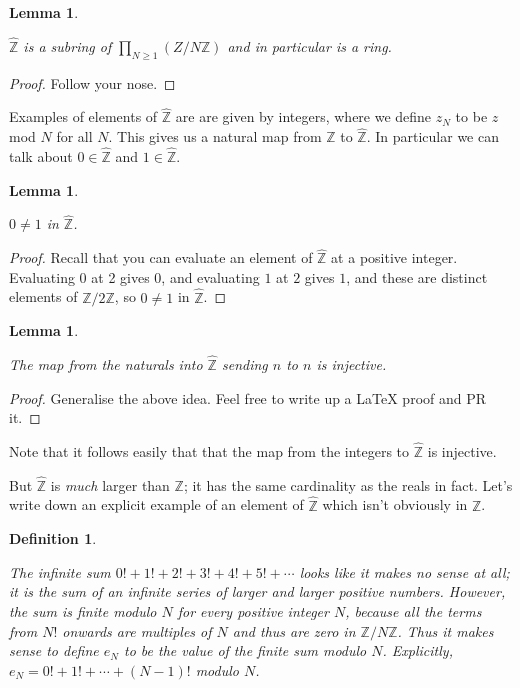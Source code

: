 \documentclass[10pt,a4paper]{article}
\newcommand{\Z}{\mathbb{Z}}
\newcommand{\Zhat}{\widehat{\Z}}
\newtheorem{lemma}[theorem]{Lemma}
\newtheorem{definition}[theorem]{Definition}
\newcommand{\uses}[1]{}
\newcommand{\lean}[1]{}
\newcommand{\leanok}{}
\begin{document}
\begin{lemma}
    \label{ZHat.commRing}
    \lean{ZHat.commRing}
    \uses{ZHat}
    \leanok
    $\Zhat$ is a subring of $\prod_{N\geq1}(Z/N\Z)$ and in particular is a ring.
\end{lemma}
\begin{proof} \leanok Follow your nose.
\end{proof}

Examples of elements of $\Zhat$ are are given by integers, where we define $z_N$ to be $z$
mod $N$ for all $N$. This gives us a natural map from $\Z$ to $\Zhat$. In particular we
can talk about $0\in\Zhat$ and $1\in\Zhat$.

\begin{lemma}
    \label{ZHat.nontrivial}
    \lean{ZHat.nontrivial}
    \uses{ZHat.commRing}
    \leanok
    $0\not=1$ in $\Zhat$.
\end{lemma}
\begin{proof}
    \leanok
    Recall that you can evaluate an element of $\Zhat$ at a positive integer.
    Evaluating $0$ at 2 gives $0$, and evaluating $1$ at $2$ gives $1$, and these
    are distinct elements of $\Z/2\Z$, so $0\not=1$ in $\Zhat$.
\end{proof}

\begin{lemma}
    \label{ZHat.charZero}
    \lean{ZHat.charZero}
    \leanok
    The map from the naturals into $\Zhat$ sending $n$ to $n$ is injective.
\end{lemma}
\begin{proof}
    \leanok
    Generalise the above idea. Feel free to write up a LaTeX proof and PR it.
\end{proof}

Note that it follows easily that that the map from the integers to $\Zhat$ is injective.

But $\Zhat$
is \emph{much} larger than $\Z$; it has the same cardinality as the reals in fact.
Let's write down an explicit example of an element of $\Zhat$ which isn't obviously in $\Z$.

\begin{definition}
    \label{ZHat.e}
    \lean{ZHat.e}
    \uses{ZHat.commRing}
    \leanok
    The infinite sum $0!+1!+2!+3!+4!+5!+\cdots$ looks
    like it makes no sense at all; it is the sum of an infinite series of larger and larger
    positive numbers.
    However, the sum is \emph{finite} modulo $N$ for every positive integer $N$, because
    all the terms from $N!$ onwards are multiples of $N$ and thus are zero in $\Z/N\Z$.
    Thus it makes sense to define $e_N$ to be the value of the finite sum modulo $N$.
    Explicitly, $e_N=0!+1!+\cdots+(N-1)!$ modulo $N$.
\end{definition}
\end{document}
